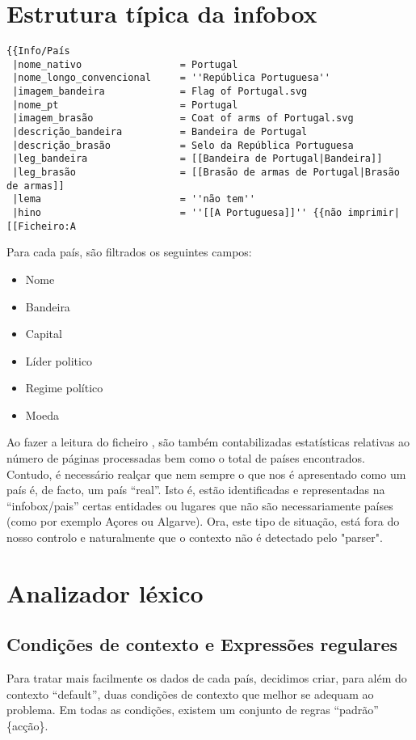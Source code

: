 \documentclass[12pt,a4paper]{report}
\begin{document}
\section{Estrutura típica da infobox}
\begin{verbatim}
{{Info/País
 |nome_nativo                 = Portugal
 |nome_longo_convencional     = ''República Portuguesa''
 |imagem_bandeira             = Flag of Portugal.svg
 |nome_pt                     = Portugal
 |imagem_brasão               = Coat of arms of Portugal.svg
 |descrição_bandeira          = Bandeira de Portugal
 |descrição_brasão            = Selo da República Portuguesa
 |leg_bandeira                = [[Bandeira de Portugal|Bandeira]]
 |leg_brasão                  = [[Brasão de armas de Portugal|Brasão de armas]]
 |lema                        = ''não tem''
 |hino                        = ''[[A Portuguesa]]'' {{não imprimir|[[Ficheiro:A
\end{verbatim}
Para cada país, são filtrados os seguintes campos:
\begin{itemize}
\item{Nome}
\item{Bandeira}
\item{Capital}
\item{Líder politico}
\item{Regime político}
\item{Moeda} 
\end{itemize}
Ao fazer a leitura do ficheiro , são também contabilizadas estatísticas relativas ao número de páginas processadas bem como o total de países encontrados. Contudo, é necessário realçar que nem sempre o que nos é apresentado como um país é, de facto, um país ``real''. Isto é, estão identificadas e representadas na ``infobox/pais'' certas entidades ou lugares que não são necessariamente países (como por exemplo Açores ou Algarve). Ora, este tipo de situação, está fora do nosso controlo e naturalmente que o contexto não é detectado pelo "parser".
\newpage
\section{Analizador léxico}
\subsection{Condições de contexto e Expressões regulares}
Para tratar mais facilmente os dados de cada país, decidimos criar, para além do contexto ``default'', duas condições de contexto que melhor se adequam ao problema. Em todas as condições, existem um conjunto de regras ``padrão'' \{acção\}.
\end{document}
